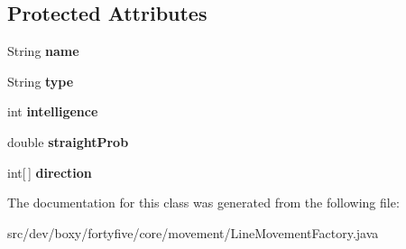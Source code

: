 \subsection*{Protected Attributes}
\begin{DoxyCompactItemize}
\item 
\hypertarget{classdev_1_1boxy_1_1fortyfive_1_1core_1_1movement_1_1_line_movement_factory_a47f2a26875781f5406856a5499c93158}{
String {\bfseries name}}
\label{d4/d4d/classdev_1_1boxy_1_1fortyfive_1_1core_1_1movement_1_1_line_movement_factory_a47f2a26875781f5406856a5499c93158}

\item 
\hypertarget{classdev_1_1boxy_1_1fortyfive_1_1core_1_1movement_1_1_line_movement_factory_a1b65e4b077919dfa6aaedca0615bdf4b}{
String {\bfseries type}}
\label{d4/d4d/classdev_1_1boxy_1_1fortyfive_1_1core_1_1movement_1_1_line_movement_factory_a1b65e4b077919dfa6aaedca0615bdf4b}

\item 
\hypertarget{classdev_1_1boxy_1_1fortyfive_1_1core_1_1movement_1_1_line_movement_factory_a2fab60f95e0878fd68980dbf7f03a72d}{
int {\bfseries intelligence}}
\label{d4/d4d/classdev_1_1boxy_1_1fortyfive_1_1core_1_1movement_1_1_line_movement_factory_a2fab60f95e0878fd68980dbf7f03a72d}

\item 
\hypertarget{classdev_1_1boxy_1_1fortyfive_1_1core_1_1movement_1_1_line_movement_factory_afba0be63455edae40c9244c7d87b2f88}{
double {\bfseries straightProb}}
\label{d4/d4d/classdev_1_1boxy_1_1fortyfive_1_1core_1_1movement_1_1_line_movement_factory_afba0be63455edae40c9244c7d87b2f88}

\item 
\hypertarget{classdev_1_1boxy_1_1fortyfive_1_1core_1_1movement_1_1_line_movement_factory_a3db514c3bdb29c9e68c5b2c618c5e8c0}{
int\mbox{[}$\,$\mbox{]} {\bfseries direction}}
\label{d4/d4d/classdev_1_1boxy_1_1fortyfive_1_1core_1_1movement_1_1_line_movement_factory_a3db514c3bdb29c9e68c5b2c618c5e8c0}

\end{DoxyCompactItemize}


The documentation for this class was generated from the following file:\begin{DoxyCompactItemize}
\item 
src/dev/boxy/fortyfive/core/movement/LineMovementFactory.java\end{DoxyCompactItemize}
